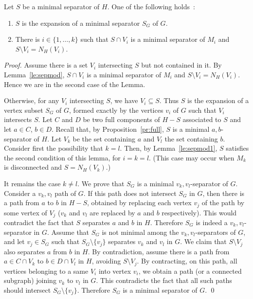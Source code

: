 \documentclass{llncs}
\begin{document}
\begin{lemma}\label{le:sepexp}
Let $S$ be a minimal separator of $H$. One of the following holds~:
\begin{enumerate}
\item $S$ is the expansion of a minimal separator $S_G$ of $G$. 
\item There is $i \in \{1,\dots, k\}$ such that $S \cap V_i$ is a minimal separator of $M_i$ and $S \setminus V_i = N_H(V_i)$.
\end{enumerate}
\end{lemma}
\begin{proof}
Assume there is a set $V_i$ intersecting $S$ but not contained in it. By Lemma~\ref{le:sepmod}, $S \cap V_i$ is a minimal separator of $M_i$ and $S \setminus V_i = N_H(V_i)$. Hence we are in the second case of the Lemma.


Otherwise, for any $V_i$ intersecting $S$, we have $V_i \subseteq S$. Thus $S$ is the expansion of a vertex subset $S_G$ of $G$, formed exactly by the vertices $v_i$ of $G$ such that $V_i$ intersects $S$.  Let $C$ and $D$ be two full components of $H - S$ associated to $S$ and let $a \in C$, $b \in D$. Recall that, by Proposition~\ref{pr:full}, $S$ is a minimal $a,b$-separator of $H$. Let $V_k$ be the set containing $a$ and $V_l$ the set containing $b$. Consider first the possibility that $k = l$. Then, by Lemma~\ref{le:sepmod1}, $S$ satisfies the second condition of this lemma, for $i=k=l$. (This case may occur when $M_k$ is disconnected and $S = N_H(V_k)$.)


It remains the case $k \neq l$. We prove that $S_G$ is a minimal $v_k,v_l$-separator of $G$. Consider a $v_k,v_l$ path of $G$. If this path does not intersect $S_G$ in $G$, then there is a path from $a$ to $b$ in $H - S$, obtained by replacing each vertex $v_j$ of the path by some vertex of $V_j$ ($v_k$ and $v_l$ are replaced by $a$ and $b$ respectively). This would contradict the fact that $S$ separates $a$ and $b$ in $H$. Therefore $S_G$ is indeed a $v_k,v_l$-separator in $G$. Assume that $S_G$ is not minimal among the $v_k,v_l$-separators of $G$, and let $v_j \in S_G$ such that $S_G \setminus \{v_j\}$ separates $v_k$ and $v_l$ in $G$. We claim that $S \setminus V_j$ also separates $a$ from $b$ in $H$. By contradiction, assume there is a path from $a \in C \cap V_k$ to $b \in D \cap V_l$ in $H$, avoiding $S \setminus V_j$. By contracting, on this path, all vertices belonging to a same $V_i$ into vertex $v_i$, we obtain a path (or a connected subgraph) joining $v_k$ to $v_l$ in $G$. This contradicts the fact that all such paths should intersect $S_G \setminus \{v_j\}$. Therefore $S_G$ is a minimal separator of $G$. 
\qed
\end{proof}
\end{document}
